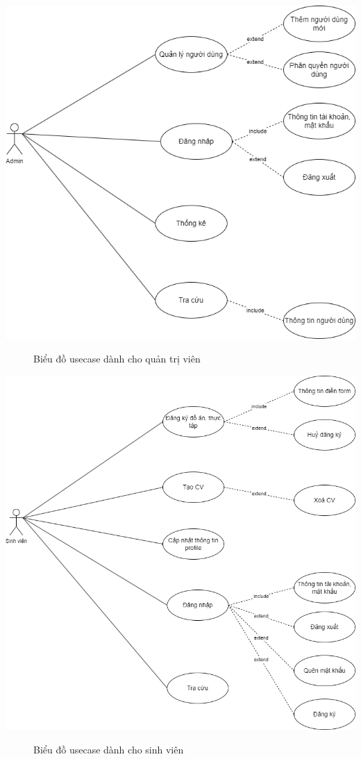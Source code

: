     \begin{center}
      \includegraphics[width=.9\textwidth]{../drawio/usecase2.png}
      \begin{figure}[h]
        \centering
        \caption{Biểu đồ usecase dành cho quản trị viên}
      \end{figure}
    \end{center}
    \begin{center}
      \includegraphics[width=.9\textwidth]{../drawio/usecase3.png}
      \begin{figure}[h]
        \centering
        \caption{Biểu đồ usecase dành cho sinh viên}
      \end{figure}
    \end{center}
